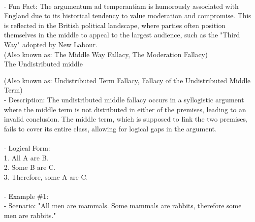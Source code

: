 \documentclass[a4paper,12pt,single,pdftex]{scrbook}
\begin{document}
    
      
    \\

    
      - Fun Fact: The argumentum ad temperantiam is humorously associated with England due to its historical tendency to value moderation and compromise. This is reflected in the British political landscape, where parties often position themselves in the middle to appeal to the largest audience, such as the "Third Way" adopted by New Labour.
    \\

  
    
      (Also known as: The Middle Way Fallacy, The Moderation Fallacy)
    \\

  

The Undistributed middle
    
      (Also known as: Undistributed Term Fallacy, Fallacy of the Undistributed Middle Term)
    \\

  
    
      - Description: The undistributed middle fallacy occurs in a syllogistic argument where the middle term is not distributed in either of the premises, leading to an invalid conclusion. The middle term, which is supposed to link the two premises, fails to cover its entire class, allowing for logical gaps in the argument.
    \\

    
      
    \\

    
      - Logical Form:
    \\

    
        1. All A are B.
    \\

    
        2. Some B are C.
    \\

    
        3. Therefore, some A are C.
    \\

    
      
    \\

    
      - Example \#1:
    \\

    
        - Scenario: "All men are mammals. Some mammals are rabbits, therefore some men are rabbits."
    \\
\end{document}
